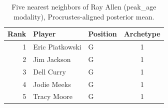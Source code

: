 \begin{table}[htbp]
  \centering\small
  \begin{tabular}{rllc}
    \toprule
    Rank & Player & Position & Archetype \\
    \midrule
    1 & Eric Piatkowski & G & 1 \\
    2 & Jim Jackson & G & 1 \\
    3 & Dell Curry & G & 1 \\
    4 & Jodie Meeks & G & 1 \\
    5 & Tracy Moore & G & 1 \\
    \bottomrule
  \end{tabular}
  \caption{Five nearest neighbors of Ray Allen (peak_age modality), Procrustes-aligned posterior mean.}
  \label{tab:Ray_Allen_neighbors_peak_age}
\end{table}

